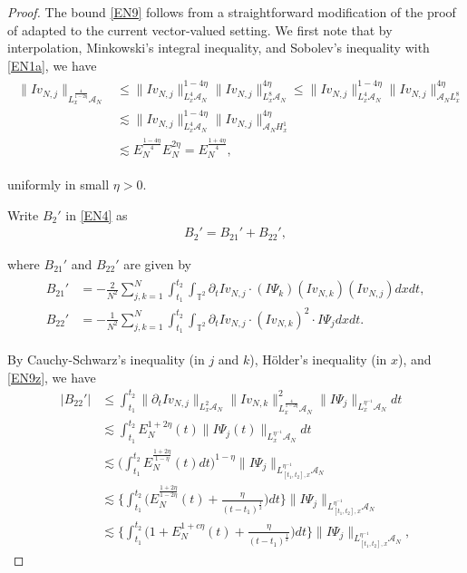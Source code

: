 \documentclass[letterpaper, 11pt,  reqno]{amsart}
\newcommand{\1}{\hspace{0.5mm}\text{I}\hspace{0.2mm}}
\newcommand{\noi}{\noindent}
\newcommand{\T}{\mathbb{T}}
\newcommand{\dt}{\partial_t}
\newcommand{\les}{\lesssim}
\newcommand{\A}{\mathcal{A}}
\newcommand{\EN}{E_N}
\numberwithin{equation}{section}
\numberwithin{theorem}{section}
\begin{document}
\begin{proof} 
The bound \eqref{EN9} follows
from a straightforward modification
of the proof of 
\cite[Lemma~3.4]{GKOT}
adapted to the current vector-valued setting.
We first note that 
by interpolation, 
Minkowski's integral inequality, 
and Sobolev's inequality with \eqref{EN1a}, we have
 \begin{align}
\begin{split}
\|I v_{N, j}\|_{L^{\frac 4 {1- 2\eta}}_x\A_N}
& \le
\|I v_{N, j}\|_{L^4_x\A_N}^{1 - 4\eta}
\|I v_{N, j}\|_{L^8_x\A_N}^{4\eta}
 \le
\|I v_{N, j}\|_{L^4_x\A_N}^{1 - 4\eta}
\|I v_{N, j}\|_{\A_NL^8_x}^{4\eta}\\
& \les 
\|I v_{N, j}\|_{L^4_x\A_N}^{1 - 4\eta}
\|I v_{N, j}\|_{\A_N H^1_x}^{4\eta}
\\
&   \les 
\EN^\frac {1-4\eta} 4
\EN^{2\eta}
= 
\EN^{\frac{1+4\eta}{4}} , 
\end{split}
\label{EN9z}
 \end{align}


\noi
uniformly in small $\eta > 0$.




Write $B_2'$ in \eqref{EN4}
as 
\begin{align*}
B_2' = B_{21}' + B_{22}',
\end{align*}

\noi
where 
$B_{21}'$ and $B_{22}'$ are given by 
\begin{align} 
\begin{split}
B_{21}' & =  
- \frac{2}{N^2}
\sum_{j, k =1}^N
\int_{t_1}^{t_2} \int_{\T^2}   \dt I v_{N,j} \cdot
 (I \Psi_k)( I v_{N,k})( I v_{N,j}) d x d t, \\
B_{22}' & =  
- \frac{1}{N^2}
\sum_{j, k =1}^N
\int_{t_1}^{t_2} \int_{\T^2}   \dt I v_{N,j} \cdot
 ( I v_{N,k})^2 \cdot I \Psi_j  d x d t.
\end{split}
\label{EN9b}
\end{align} 


\noi
By Cauchy-Schwarz's inequality (in $j$ and $k$), 
H\"older's inequality (in $x$), 
and \eqref{EN9z}, we have 
 \begin{align*}
|B_{22}'|
&\le \int_{t_1}^{t_2}
\|\dt Iv_{N, j}\|_{L^2_x\A_N} 
\|Iv_{N, k}\|_{L^{\frac 4 {1- 2\eta}}_x\A_N}^2
 \|I\Psi_j \|_{L_x^{\eta^{-1}}\A_N} dt \\
& \les \int_{t_1}^{t_2} \EN^{1 +2 \eta} (t) \|I \Psi_j (t)\|_{L_x^{\eta^{-1}}\A_N} dt \\
& \les \bigg(\int_{t_1}^{t_2} \EN^{\frac{1 + 2\eta}{1-\eta}}(t)dt\bigg)^{1-\eta}
\|I \Psi_j \|_{L^{\eta^{-1}}_{[t_1, t_2], x} \A_N}\\
& \lesssim 
\bigg\{\int_{t_1}^{t_2}
\Big( \EN^{\frac{1+2\eta}{1-2\eta}}(t) + \frac{\eta}{(t-t_1)^\frac12}\Big) dt
\bigg\}\|I \Psi_j \|_{L^{\eta^{-1}}_{[t_1, t_2], x} \A_N}\\
& \les \bigg\{\int_{t_1}^{t_2} 
\Big(1 + 
 \EN^{1 + c\eta} (t)+ \frac {\eta}{(t - t_1)^{\frac 12}}  \Big) d t\bigg\}
\| I \Psi_j \|_{L^{\eta^{-1}}_{[t_1, t_2], x} \A_N } , 
 \end{align*}
 

\end{proof}
\end{document}
